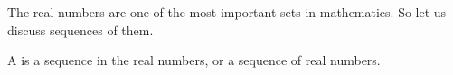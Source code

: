 

The real numbers are
one of the most important
sets in mathematics. So let
us discuss sequences of them.


A 
is a sequence in the real
numbers, or a sequence of
real numbers.
